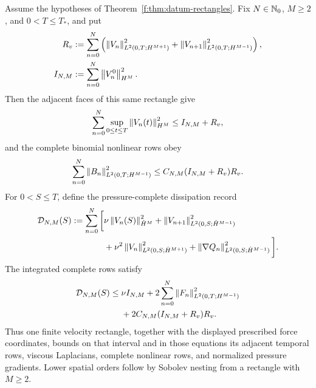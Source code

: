\begin{proposition}
\label{f:prop:rectangle-bounds-complete-rows}
Assume the hypotheses of Theorem~\ref{f:thm:datum-rectangles}.  Fix
\(N\in\mathbb N_0\), \(M\ge2\), and \(0<T\le T_*\), and put
\begin{align*}
 R_v&:=\sum_{n=0}^N\left(
 \left\lVert V_n\right\rVert_{L^2(0,T;H^{M+1})}^2
 +\left\lVert V_{n+1}\right\rVert_{L^2(0,T;H^{M-1})}^2\right),\\
 I_{N,M}&:=\sum_{n=0}^N\left\lVert V_n^0\right\rVert_{H^M}^2.
\end{align*}
Then the adjacent faces of this same rectangle give
\begin{equation}
 \sum_{n=0}^N\sup_{0\le t\le T}\left\lVert V_n(t)\right\rVert_{H^M}^2
 \le I_{N,M}+R_v,
 \label{f:eq:rectangle-adjacent-trace-bound}
\end{equation}
and the complete binomial nonlinear rows obey
\begin{equation}
 \sum_{n=0}^N\left\lVert B_n\right\rVert_{L^2(0,T;H^{M-1})}^2
 \le C_{N,M}(I_{N,M}+R_v)R_v.
 \label{f:eq:rectangle-complete-binomial-bound}
\end{equation}
For \(0<S\le T\), define the pressure-complete dissipation record
\begin{align*}
 \mathcal D_{N,M}(S):=\sum_{n=0}^N\bigg[&
 \nu\left\lVert V_n(S)\right\rVert_{\dot H^M}^2
 +\left\lVert V_{n+1}\right\rVert_{L^2(0,S;\dot H^{M-1})}^2\\
 &+\nu^2\left\lVert V_n\right\rVert_{L^2(0,S;\dot H^{M+1})}^2
 +\left\lVert \nabla Q_n\right\rVert_{L^2(0,S;\dot H^{M-1})}^2\bigg].
\end{align*}
The integrated complete rows satisfy
\begin{align}
 \mathcal D_{N,M}(S)
 \le{}&\nu I_{N,M}
 +2\sum_{n=0}^N\left\lVert F_n\right\rVert_{L^2(0,T;H^{M-1})}^2
 \notag\\
 &+2C_{N,M}(I_{N,M}+R_v)R_v.
 \label{f:eq:rectangle-complete-row-bound}
\end{align}
Thus one finite velocity rectangle, together with the displayed prescribed
force coordinates, bounds on that interval and in those equations its
adjacent temporal rows, viscous Laplacians, complete nonlinear rows, and
normalized pressure gradients.  Lower spatial orders follow by Sobolev nesting
from a rectangle with \(M\ge2\).
\end{proposition}

